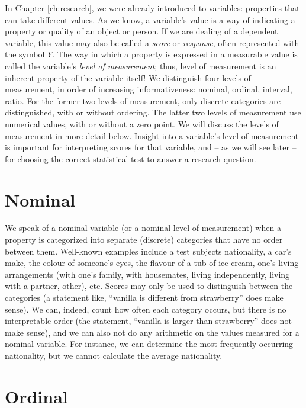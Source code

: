 \documentclass[
]{book}
\begin{document}
In Chapter \ref{ch:research}, we were already introduced to variables: properties that can take different values. As we know, a variable's value is a way of indicating a property or quality of an object or person. If we are dealing of a dependent variable, this value may also be called a \emph{score} or \emph{response}, often represented with the symbol \(Y\). The way in which a property is expressed in a measurable value is called the variable's \emph{level of measurement}; thus, level of measurement is an inherent property of the variable itself! We distinguish four levels of measurement, in order of increasing informativeness: nominal, ordinal, interval, ratio. For the former two levels of measurement, only discrete categories are distinguished, with or without ordering. The latter two levels of measurement use numerical values, with or without a zero point. We will discuss the levels of measurement in more detail below. Insight into a variable's level of measurement is important for interpreting scores for that variable, and -- as we will see later -- for choosing the correct statistical test to answer a research question.

\hypertarget{sec:nominal}{%
\section{Nominal}\label{sec:nominal}}

We speak of a nominal variable (or a nominal level of measurement) when a property is categorized into separate (discrete) categories that have no order between them. Well-known examples include a test subjects nationality, a car's make, the colour of someone's eyes, the flavour of a tub of ice cream, one's living arrangements (with one's family, with housemates, living independently, living with a partner, other), etc. Scores may only be used to distinguish between the categories (a statement like, ``vanilla is different from strawberry'' does make sense). We can, indeed, count how often each category occurs, but there is no interpretable order (the statement, ``vanilla is larger than strawberry'' does not make sense), and we can also not do any arithmetic on the values measured for a nominal variable. For instance, we can determine the most frequently occurring nationality, but we cannot calculate the average nationality.

\hypertarget{sec:ordinal}{%
\section{Ordinal}\label{sec:ordinal}}
\end{document}
